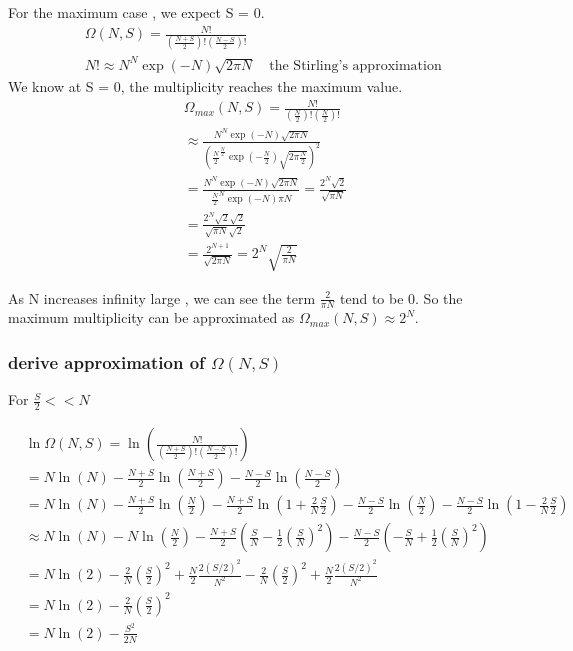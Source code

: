 \documentclass[a4paper,11pt]{article}
\begin{document}
For the maximum case , we expect S = 0.
\begin{align*}
& \Omega(N,S) = \frac{N!}{(\frac{N+S }{2})!(\frac{N-S}{2})!} 
\\
& N! \approx N^N \exp(-N) \sqrt{2\pi N} \quad  \text{the Stirling’s approximation }
\end{align*}
We know at S = 0, the multiplicity reaches the maximum value. 
\begin{align*}
& \Omega_{max}(N,S) 
= \frac{N!}{(\frac{N }{2})!(\frac{N}{2})!} 
\\
& \approx \frac{ N^N \exp(-N) \sqrt{2\pi N} }{(\frac{N}{2}^{\frac{N}{2}} \exp(-\frac{N}{2}) \sqrt{2\pi  \frac{N}{2}})^2}
\\
& =  \frac{ N^N \exp(-N) \sqrt{2\pi N} }{\frac{N}{2}^{N} \exp(-N) \pi N}
 = \frac{2^N \sqrt{2} }{\sqrt{\pi N}}
\\
& = \frac{2^N \sqrt{2}  \sqrt{2}}{\sqrt{\pi N} \sqrt{2}}\\
& = \frac{2^{N+1} }{\sqrt{2 \pi N}}
= 2^N \sqrt{\frac{2}{\pi N}}
\end{align*}


As N increases infinity large , we can see the term $\frac{2}{\pi N}$ tend to be 0. So the maximum multiplicity can be approximated as $\Omega_{max}(N,S) \approx 2^N $.



\subsubsection{derive approximation of $\Omega(N, S)$}

For $\frac{S}{2} << N$

\begin{align*}
&  \ln \Omega(N, S)  
= \ln(\frac{N!}{(\frac{N + S}{2})!(\frac{N - S}{2})!} )
\\
& = N\ln(N) -\frac{N + S}{2}\ln(\frac{N + S}{2}) -\frac{N - S}{2}\ln(\frac{N - S}{2})\\
& = N\ln(N) -\frac{N + S}{2}\ln(\frac{N}{2}) - \frac{N + S}{2}\ln(1+ \frac{2}{N}\frac{S}{2})-\frac{N - S}{2}\ln(\frac{N}{2}) -\frac{N - S}{2}\ln(1- \frac{2}{N}\frac{S}{2})
\\
& \approx  N\ln(N) - N\ln(\frac{N}{2})-  \frac{N + S}{2} ( \frac{S}{N}- \frac{1}{2}(\frac{S}{N})^2)  -\frac{N - S}{2} (-\frac{S}{N} +  \frac{1}{2}(\frac{S}{N})^2)
\\
& =  N\ln(2)- \frac{2}{N}(\frac{S}{2})^2 + \frac{N}{2}\frac{2(S/2)^2}{N^2} - \frac{2}{N}(\frac{S}{2})^2 + \frac{N}{2}\frac{2(S/2)^2}{N^2}
\\
& =  N\ln(2) - \frac{2}{N}(\frac{S}{2})^2
\\
&=  N\ln(2) - \frac{S^2}{2N}
\end{align*}
\end{document}
